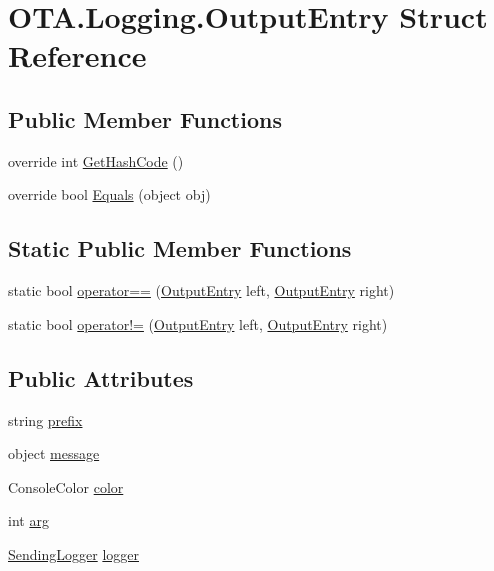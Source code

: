 \hypertarget{struct_o_t_a_1_1_logging_1_1_output_entry}{}\section{O\+T\+A.\+Logging.\+Output\+Entry Struct Reference}
\label{struct_o_t_a_1_1_logging_1_1_output_entry}
\subsection*{Public Member Functions}
\begin{DoxyCompactItemize}
\item 
override int \hyperlink{struct_o_t_a_1_1_logging_1_1_output_entry_aa697cfedb18898ba59bb3bae3e961ea5}{Get\+Hash\+Code} ()
\item 
override bool \hyperlink{struct_o_t_a_1_1_logging_1_1_output_entry_a732cabe51215f2069609d444ecf1f9e0}{Equals} (object obj)
\end{DoxyCompactItemize}
\subsection*{Static Public Member Functions}
\begin{DoxyCompactItemize}
\item 
static bool \hyperlink{struct_o_t_a_1_1_logging_1_1_output_entry_a6b613cbc852cc361debdadf68d6ae334}{operator==} (\hyperlink{struct_o_t_a_1_1_logging_1_1_output_entry}{Output\+Entry} left, \hyperlink{struct_o_t_a_1_1_logging_1_1_output_entry}{Output\+Entry} right)
\item 
static bool \hyperlink{struct_o_t_a_1_1_logging_1_1_output_entry_ae39a8af0703b5cd3e4b95522c970fbd2}{operator!=} (\hyperlink{struct_o_t_a_1_1_logging_1_1_output_entry}{Output\+Entry} left, \hyperlink{struct_o_t_a_1_1_logging_1_1_output_entry}{Output\+Entry} right)
\end{DoxyCompactItemize}
\subsection*{Public Attributes}
\begin{DoxyCompactItemize}
\item 
string \hyperlink{struct_o_t_a_1_1_logging_1_1_output_entry_a92edba73bf05c8e98e7db58c4f99be3d}{prefix}
\item 
object \hyperlink{struct_o_t_a_1_1_logging_1_1_output_entry_a352da5806e37d8f7091f0dfdcada285c}{message}
\item 
Console\+Color \hyperlink{struct_o_t_a_1_1_logging_1_1_output_entry_ab0b09a9d410e3b2a0837432efdd795e6}{color}
\item 
int \hyperlink{struct_o_t_a_1_1_logging_1_1_output_entry_a5ddb09bc0df52aa3940753a74906e22a}{arg}
\item 
\hyperlink{namespace_o_t_a_1_1_logging_a8bc0baa35da015be032d07e537448cb2}{Sending\+Logger} \hyperlink{struct_o_t_a_1_1_logging_1_1_output_entry_acbece06fc80da6ac6f2eaf5bad08bc97}{logger}
\end{DoxyCompactItemize}


